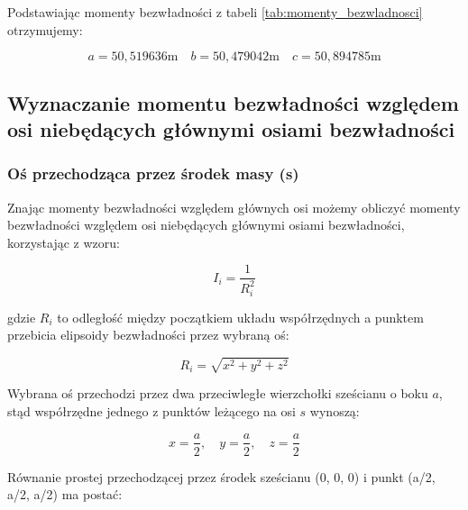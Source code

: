 \documentclass[a4paper,12pt]{article}
\begin{document}
Podstawiając momenty bezwładności z tabeli \ref{tab:momenty_bezwladnosci} otrzymujemy:

\begin{equation*}
    a=50,519636 \text{m} \quad
    b=50,479042 \text{m} \quad
    c=50,894785 \text{m}
\end{equation*}

\subsection{Wyznaczanie momentu bezwładności względem osi niebędących głównymi osiami bezwładności}


\subsubsection{Oś przechodząca przez środek masy (s)}

Znając momenty bezwładności względem głównych osi możemy obliczyć momenty bezwładności względem osi niebędących głównymi osiami bezwładności, korzystając z wzoru:

\begin{equation} \label{eq:moment_bezwladnosci_elipsoida}
    I_i = \frac{1}{R_i^2}
\end{equation}

gdzie $R_i$ to odległość między początkiem układu współrzędnych a punktem przebicia elipsoidy bezwładności przez wybraną oś:

\begin{equation} \label{eq:odleglosc_od_srodka_masy_do_punktu_przebicia_osi}
    R_i = \sqrt{x^2 + y^2 + z^2}
\end{equation}

Wybrana oś przechodzi przez dwa przeciwległe wierzchołki sześcianu o boku $a$, stąd współrzędne jednego z punktów leżącego na osi $s$ wynoszą:

\begin{equation*}
    x = \frac{a}{2}, \quad
    y = \frac{a}{2}, \quad
    z = \frac{a}{2}
\end{equation*}

Równanie prostej przechodzącej przez środek sześcianu (0, 0, 0) i punkt (a/2, a/2, a/2) ma postać:
\end{document}
